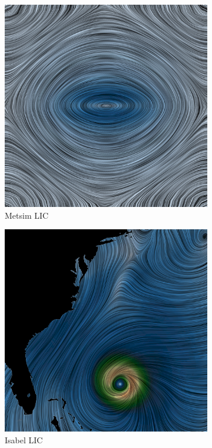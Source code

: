 \documentclass{article}
\begin{document}
\begin{figure}[h!]
    \centering
    \begin{subfigure}{0.48\textwidth}
        \centering
        \includegraphics[width=\textwidth]{LIC_metsim.png}
        \caption{Metsim LIC}
    \end{subfigure}
    \hfill
    \begin{subfigure}{0.48\textwidth}
        \centering
        \includegraphics[width=\textwidth]{LIC_isabel.png}
        \caption{Isabel LIC}
    \end{subfigure}
    \caption{}
\end{figure}
\end{document}
